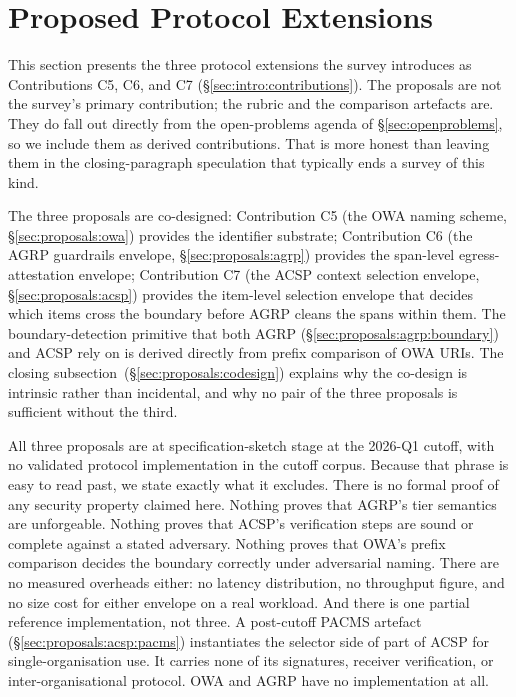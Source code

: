\section{Proposed Protocol Extensions}
\label{sec:proposals}
\setlength{\emergencystretch}{3em}

This section presents the three protocol extensions the
survey introduces as Contributions C5, C6, and C7
(\S\ref{sec:intro:contributions}). The proposals are not
the survey's primary contribution; the rubric and the
comparison artefacts are. They do fall out directly
from the open-problems agenda of \S\ref{sec:openproblems},
so we include them as derived contributions. That is more
honest than leaving them in the closing-paragraph
speculation that typically ends a survey of this kind.

The three proposals are co-designed: Contribution C5 (the
OWA naming scheme, \S\ref{sec:proposals:owa}) provides the
identifier substrate; Contribution C6 (the AGRP guardrails
envelope, \S\ref{sec:proposals:agrp}) provides the
span-level egress-attestation envelope; Contribution C7
(the ACSP context selection envelope,
\S\ref{sec:proposals:acsp}) provides the
item-level selection envelope that decides which items
cross the boundary before AGRP cleans the spans within
them. The boundary-detection primitive that both AGRP
(\S\ref{sec:proposals:agrp:boundary}) and ACSP rely on is
derived directly from prefix comparison of OWA URIs. The
closing
subsection~(\S\ref{sec:proposals:codesign}) explains why
the co-design is intrinsic rather than incidental, and
why no pair of the three proposals is sufficient without
the third.

All three proposals are at specification-sketch stage at
the 2026-Q1 cutoff, with no validated protocol
implementation in the cutoff corpus. Because that phrase is
easy to read past, we state exactly what it excludes. There
is no formal proof of any security property claimed here.
Nothing proves that AGRP's tier semantics are unforgeable.
Nothing proves that ACSP's verification steps are sound or
complete against a stated adversary. Nothing proves that
OWA's prefix comparison decides the boundary correctly under
adversarial naming. There are no measured overheads either:
no latency distribution, no throughput figure, and no size
cost for either envelope on a real workload. And there is one partial
reference implementation, not three. A post-cutoff PACMS
artefact (\S\ref{sec:proposals:acsp:pacms}) instantiates the
selector side of part of ACSP for single-organisation use. It
carries none of its signatures, receiver verification, or
inter-organisational protocol. OWA and AGRP have no
implementation at all.

